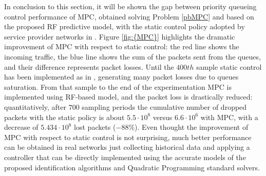 In conclusion to this section, it will be shown the gap between priority queueing control performance of MPC, obtained solving Problem \ref{pbMPC} and based on the proposed RF predictive model, with the static control policy adopted by service provider networks in \cite{Notiziario}. Figure \ref{fig:{MPC}} highlights the dramatic improvement of MPC with respect to static control: the red line shows the incoming traffic, the blue line shows the sum of the packets sent from the queues, and their difference represents packet losses. Until the $400th$ sample static control has been implemented as in \cite{Notiziario}, generating many packet losses due to queues saturation. From that sample to the end of the experimentation MPC is implemented using RF-based model, and the packet loss is drastically reduced: quantitatively, after $700$ sampling periods the cumulative number of dropped packets with the static policy is about $5.5\cdot10^8$ versus $6.6\cdot10^6$ with MPC, with a decrease of $5.434\cdot10^8$ lost packets ($-88 \%$).
Even thought the improvement of MPC with respect to static control is not surprising, much better performance can be obtained in real networks just collecting historical data and applying a controller that can be directly implemented using the accurate models of the proposed identification algorithms and Quadratic Programming standard solvers.


